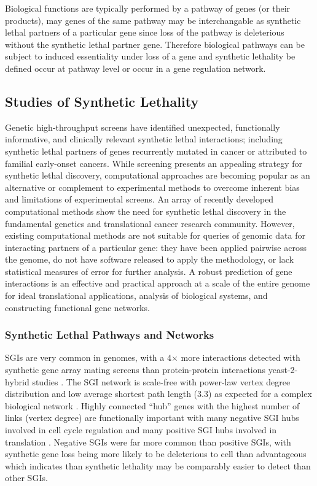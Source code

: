 Biological functions are typically performed by a pathway of genes (or their products), may genes of the same pathway may be interchangable as synthetic lethal partners of a particular gene since loss of the pathway is deleterious without the synthetic lethal partner gene. Therefore biological pathways can be subject to induced essentiality under loss of a gene and synthetic lethality be defined occur at pathway level or occur in a gene regulation network. 

\subsection{Studies of Synthetic Lethality}
Genetic high-throughput screens have identified unexpected, functionally informative, and clinically relevant synthetic lethal interactions; including synthetic lethal partners of genes recurrently mutated in cancer or attributed to familial early-onset cancers. While screening presents an appealing strategy for synthetic lethal discovery, computational approaches are becoming popular as an alternative or complement to experimental methods to overcome inherent bias and limitations of experimental screens. An array of recently developed computational methods \citep{Wang2013, Tiong2014, Jerby2014, Lu2015, Wappett2014} show the need for synthetic lethal discovery in the fundamental genetics and translational cancer research community. However, existing computational methods are not suitable for queries of genomic data for interacting partners of a particular gene: they have been applied pairwise across the genome, do not have software released to apply the methodology, or lack statistical measures of error for further analysis. A robust prediction of gene interactions is an effective and practical approach at a scale of the entire genome for ideal translational applications, analysis of biological systems, and constructing functional gene networks.

\subsubsection{Synthetic Lethal Pathways and Networks}
SGIs are very common in genomes, with a 4$\times$ more interactions detected with synthetic gene array mating screens than protein-protein interactions yeast-2-hybrid studies \citep{Tong2004}. The SGI network is scale-free with power-law vertex degree distribution and low average shortest path length (3.3) as expected for a complex biological network \citep{Barabasi2004}. Highly connected ``hub'' genes with the highest number of links (vertex degree) are functionally important with many negative SGI hubs involved in cell cycle regulation and many positive SGI hubs involved in translation \citep{Baryshnikova2010b, Costanzo2010}. Negative SGIs were far more common than positive SGIs, with synthetic gene loss being more likely to be deleterious to cell than advantageous which indicates than synthetic lethality may be comparably easier to detect than other SGIs. 


